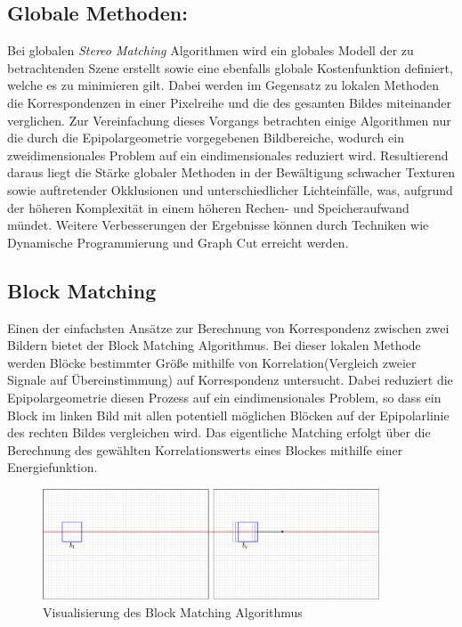 \subsection{Globale Methoden:}
\label{subsec:global_methods}
Bei globalen \emph{Stereo Matching} Algorithmen wird ein globales Modell der zu betrachtenden Szene erstellt sowie eine ebenfalls globale Kostenfunktion definiert, welche es zu minimieren gilt. Dabei werden im Gegensatz zu lokalen Methoden die Korrespondenzen in einer Pixelreihe und die des gesamten Bildes miteinander verglichen. 
Zur Vereinfachung dieses Vorgangs betrachten einige Algorithmen nur die durch die Epipolargeometrie vorgegebenen Bildbereiche, wodurch ein zweidimensionales Problem auf ein eindimensionales reduziert wird. Resultierend daraus liegt die Stärke globaler Methoden in der Bewältigung schwacher Texturen sowie auftretender Okklusionen und unterschiedlicher Lichteinfälle, was, aufgrund der höheren Komplexität in einem höheren Rechen- und Speicheraufwand mündet. Weitere Verbesserungen der Ergebnisse können durch Techniken wie Dynamische Programmierung und Graph Cut erreicht werden.

\subsection{Block Matching}
\label{subsec:stereo_matching_bm}
Einen der einfachsten Ansätze zur Berechnung von Korrespondenz zwischen zwei Bildern bietet der Block Matching Algorithmus. Bei dieser lokalen Methode werden Blöcke bestimmter Größe mithilfe von Korrelation(Vergleich zweier Signale auf Übereinstimmung) auf Korrespondenz untersucht. Dabei reduziert die Epipolargeometrie diesen Prozess auf ein eindimensionales Problem, so dass ein Block im linken Bild mit allen potentiell möglichen Blöcken auf der Epipolarlinie des rechten Bildes vergleichen wird. Das eigentliche Matching erfolgt über die Berechnung des gewählten Korrelationswerts eines Blockes mithilfe einer Energiefunktion.

\begin{figure}[h]
	\begin{center}
		\includegraphics[width=10cm]{img/block_matching.pdf}
	\end{center}
	\caption{Visualisierung des Block Matching Algorithmus}
	\label{fig:block_matching}
\end{figure}

